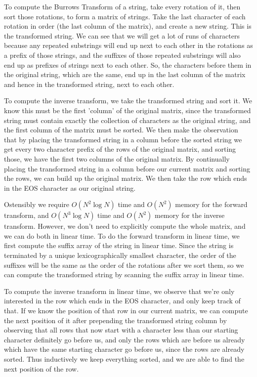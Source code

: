 \documentclass[a4paper]{article}
\begin{document}
\begin{multicols}{2}
To compute the Burrows Transform of a string, take every rotation of it, then sort those rotations, to form a matrix of strings. Take the last character of each rotation in order (the last column of the matrix), and create a new string. This is the transformed string. We can see that we will get a lot of runs of characters because any repeated substrings will end up next to each other in the rotations as a prefix of those strings, and the suffixes of those repeated substrings will also end up as prefixes of strings next to each other. So, the characters before them in the original string, which are the same, end up in the last column of the matrix and hence in the transformed string, next to each other.

To compute the inverse transform, we take the transformed string and sort it. We know this must be the first 'column' of the original matrix, since the transformed string must contain exactly the collection of characters as the original string, and the first column of the matrix must be sorted. We then make the observation that by placing the transformed string in a column before the sorted string we get every two character prefix of the rows of the original matrix, and sorting those, we have the first two columns of the original matrix. By continually placing the transformed string in a column before our current matrix and sorting the rows, we can build up the original matrix. We then take the row which ends in the EOS character as our original string.

Ostensibly we require $O(N^2 \log{N})$ time and $O(N^2)$ memory for the forward transform, and $O(N^3 \log{N})$ time and $O(N^2)$ memory for the inverse transform. However, we don't need to explicitly compute the whole matrix, and we can do both in linear time. To do the forward transform in linear time, we first compute the suffix array of the string in linear time. Since the string is terminated by a unique lexicographically smallest character, the order of the suffixes will be the same as the order of the rotations after we sort them, so we can compute the transformed string by scanning the suffix array in linear time.

To compute the inverse transform in linear time, we observe that we're only interested in the row which ends in the EOS character, and only keep track of that. If we know the position of that row in our current matrix, we can compute the next position of it after prepending the transformed string column by observing that all rows that now start with a character less than our starting character definitely go before us, and only the rows which are before us already which have the same starting character go before us, since the rows are already sorted. Thus inductively we keep everything sorted, and we are able to find the next position of the row.


\end{multicols}
\end{document}
